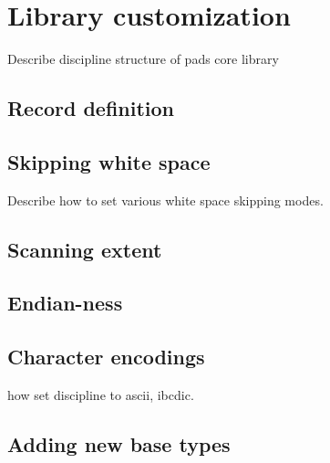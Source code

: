 \chapter{Library customization}
\label{chap:library-customization}
Describe discipline structure of pads core library
\section{Record definition}

\section{Skipping white space}
\label{sec:library-customization-white-space}
Describe how to set various white space skipping modes.

\section{Scanning extent}
\label{sec:library-customization-scanning-extent}

\section{Endian-ness}
\label{sec:library-customization-endian}

\section{Character encodings}
\label{sec:library-customization-character-encodings}
how set discipline to ascii, ibcdic.

\section{Adding new base types}
\label{sec:library-adding-new-base-types}
